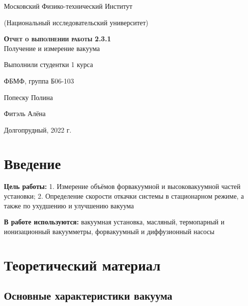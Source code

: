 \documentclass[12pt,a4paper]{article}
\begin{document}
\begin{titlepage}
  \begin{center}
    \huge
    Московский Физико-технический Институт
    
    (Национальный исследовательский университет)
    \vspace{0.5cm}

   
    \vspace{0.25cm}
 
    \vfill
 
    \vfill

    \textsc{\bf{Отчет о выполнении работы 2.3.1}}\\[3mm]
    
    {\LARGE  Получение и измерение вакуума}
  \bigskip
    \vfill
    
\end{center}
\vfill
\begin{flushright}

    Выполнили студентки 1 курса
    
    ФБМФ, группа Б06-103

    Попеску Полина
    
    
    Фитэль Алёна

\end{flushright}
\bigskip


\vfill

\begin{center}
  Долгопрудный, 2022 г.
\end{center}
\end{titlepage}

\section{Введение}

\textbf{Цель работы:} 
1. Измерение объёмов форвакуумной и высоковакуумной частей установки; 2. Определение скорости откачки системы в стационарном режиме, а также по ухудшению и улучшению вакуума

\textbf{В работе используются:} вакуумная установка,  масляный, термопарный и ионизационный вакуумметры,  форвакуумный и диффузионный насосы

\section{Теоретический материал}
\subsection{Основные характеристики вакуума}
\end{document}
